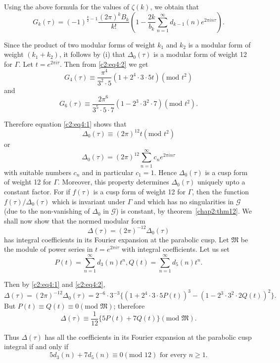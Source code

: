 Using \pageoriginale the above formula for the values of $\zeta(k)$,
we obtain that
\begin{equation*}
G_k (\tau) = (-1)^{\frac{k}{2}-1} \frac{(2\pi)^k B_k}{k!}
\left(1-\frac{2k}{b_k} \sum^{\infty}_{n=1} d_{k-1} (n)e^{2\pi i n
  \tau}\right). \tag{2}\label{c2:eq4:2}
\end{equation*}

Since the product of two modular forms of weight $k_1$ and $k_2$ is a
modular form of weight $(k_1+k_2)$, it follows by (i) that
$\Delta_0(\tau)$ is a modular form of weight 12 for $\Gamma$. Let
$t=e^{2\pi i\tau}$. Then from \eqref{c2:eq4:2} we get 
$$
G_4(\tau) \equiv \frac{\pi^4}{3^2\cdot 5}
(1+2^4\cdot 3\cdot 5 t) (\text{mod } t^2)
$$
and 
$$
G_6 (\tau) \equiv \frac{2\pi^6}{3^5\cdot 5\cdot 7} (1-2^3\cdot 3^2
\cdot 7) (\text{mod } t^2).
$$

Therefore equation \eqref{c2:eq4:1} shows that
$$
\Delta_0 (\tau) \equiv (2\pi)^{12} t (\text{mod } t^2)
$$
or
$$
\Delta_0 (\tau) = (2\pi)^{12} \sum^{\infty}_{n=1} c_n e^{2\pi i n \tau}
$$
with suitable numbers $c_n$ and in particular $c_1=1$. Hence
$\Delta_0(\tau)$ is a cusp form of weight 12 for $\Gamma$. Moreover,
this property determines $\Delta_0(\tau)$ uniquely upto a constant
factor. For if $f(\tau)$ is a cusp form of weight 12 for $\Gamma$,
then the function $f(\tau)/\Delta_0(\tau)$ which is invariant under
$\Gamma$ and which has no singularities in $\mathscr{G}$ (due to the
non-vanishing of $\Delta_0$ in $\mathscr{G}$) is constant, 
by theorem~\ref{chap2:thm12}. We shall now show that the normed modular form
$$
\Delta(\tau) = (2\pi)^{-12} \Delta_0(\tau)
$$
has \pageoriginale integral coefficients in its Fourier expansion at
the parabolic cusp. Let $\mathfrak{M}$ be the module of power series
in $t=e^{2\pi i \tau}$ with integral coefficients. Let us set
$$
P(t) = \sum^{\infty}_{n=1} d_3 (n) t^n, Q(t) = \sum^{\infty}_{n=1}
d_5(n)t^n. 
$$

Then by \eqref{c2:eq4:1} and \eqref{c2:eq4:2},
$$
\Delta(\tau) = (2\pi)^{-12} \Delta_0 (\tau) = 2^{-6} \cdot 3^{-3}
\{(1+2^4\cdot 3 \cdot 5 P(t))^3 - (1-2^3 \cdot 3^2\cdot 2 Q(t))^2\}. 
$$
But $P(t) \equiv Q(t) \equiv 0(\text{mod } \mathfrak{M})$; therefore
$$
\Delta (\tau) \equiv \frac{1}{12} \{5P(t)+7Q(t)\} (\text{mod } \mathfrak{M}).
$$

Thus $\Delta(\tau)$ has all the coefficients in its Fourier expansion
at the parabolic cusp integral if and only if 
$$
5d_3(n)+7d_5(n) \equiv 0(\text{mod } 12) \text{ for every } n \geq 1.
$$

